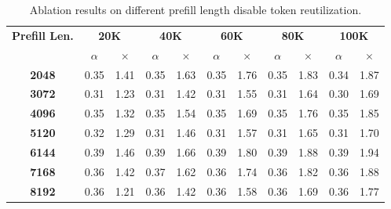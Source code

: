\begin{table}[ht]
    \renewcommand\arraystretch{1.2}
    \centering
    \small
    \caption{Ablation results on different prefill length disable token reutilization.}
    \label{tab:ablation_prefill}
    \vskip 0.15in
\begin{tabular}{c|cc|cc|cc|cc|cc}
\toprule
\multirow{2}{*}{\textbf{Prefill Len.}} & \multicolumn{2}{c|}{\textbf{20K}} & \multicolumn{2}{c|}{\textbf{40K}} & \multicolumn{2}{c|}{\textbf{60K}} & \multicolumn{2}{c|}{\textbf{80K}} & \multicolumn{2}{c}{\textbf{100K}} \\
 & $\alpha$ & $\times$ & $\alpha$ & $\times$ & $\alpha$ & $\times$ & $\alpha$ & $\times$ & $\alpha$ & $\times$ \\ \midrule
\textbf{2048} & 0.35 & 1.41 & 0.35 & 1.63 & 0.35 & 1.76 & 0.35 & 1.83 & 0.34 & 1.87 \\
\textbf{3072} & 0.31 & 1.23 & 0.31 & 1.42 & 0.31 & 1.55 & 0.31 & 1.64 & 0.30 & 1.69 \\
\textbf{4096} & 0.35 & 1.32 & 0.35 & 1.54 & 0.35 & 1.69 & 0.35 & 1.76 & 0.35 & 1.85 \\
\textbf{5120} & 0.32 & 1.29 & 0.31 & 1.46 & 0.31 & 1.57 & 0.31 & 1.65 & 0.31 & 1.70 \\
\textbf{6144} & 0.39 & 1.46 & 0.39 & 1.66 & 0.39 & 1.80 & 0.39 & 1.88 & 0.39 & 1.94 \\
\textbf{7168} & 0.36 & 1.42 & 0.37 & 1.62 & 0.36 & 1.74 & 0.36 & 1.82 & 0.36 & 1.88 \\
\textbf{8192} & 0.36 & 1.21 & 0.36 & 1.42 & 0.36 & 1.58 & 0.36 & 1.69 & 0.36 & 1.77 \\
\bottomrule
\end{tabular}
\vskip -0.1in
\end{table}